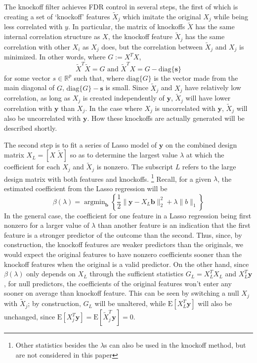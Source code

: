 \documentclass[11pt]{article}
\newcommand{\R}{\mathbb{R}}
\newcommand{\E}{\mathrm{E}}
\newcommand{\diag}[1]{\mathrm{diag}\{#1\}}
\theoremstyle{definition}
\DeclareMathOperator*{\argmin}{arg\min}
\begin{document}
    The knockoff filter achieves FDR control in several steps, the first of which is creating a set of `knockoff' features $\tilde X_j$ which imitate the original $X_j$ while being less correlated with $y$. In particular, the matrix of knockoffs $\tilde X$ has the same internal correlation structure as $X$, the knockoff feature $\tilde X_j$ has the same correlation with other $X_i$ as $X_j$ does, but the correlation between $\tilde X_j$ and $X_j$ is minimized. In other words, where $ G := X^TX$, 
    \[ \tilde X^T\tilde X=G \textrm{ and } \tilde X^T X = G - \diag{\mathbf s}\]
    for some vector $s\in \R^p$ such that, where $\diag{G}$ is the vector made from the main diagonal of $G$, $\diag{G} - \mathbf s$ is small. Since $\tilde X_j$ and $X_j$ have relatively low correlation, as long as $X_j$ is created independently of $\mathbf y$, $\tilde X_j$ will have lower correlation with $\mathbf y$ than $X_j$. In the case where $X_j$ is uncorrelated with $\mathbf y$, $\tilde X_j$ will also be uncorrelated with $\mathbf y$. How these knockoffs are actually generated will be described shortly.\par
    The second step is to fit a series of Lasso model of $\mathbf y$ on the combined design matrix $X_L=[X \; \tilde X]$ so as to determine the largest value $\lambda$ at which the coefficient for each $X_j$ and $\tilde X_j$ is nonzero. The subscript $L$ refers to the large design matrix with both features and knockoffs. \footnote{Other statistics besides the $\lambda$s can also be used in the knockoff method, but are not considered in this paper} Recall, for a given $\lambda$, the estimated coefficient from the Lasso regression will be 
    \[ \beta(\lambda) = \argmin_\mathbf b \left\{\frac{1}{2}\|\mathbf y - X_L\mathbf b\|^2_2 + \lambda\|b\|_1 \right\}\]
    In the general case, the coefficient for one feature in a Lasso regression being first nonzero for a larger value of $\lambda$ than another feature is an indication that the first feature is a stronger predictor of the outcome than the second. Thus, since, by construction, the knockoff features are weaker predictors than the originals, we would expect the original features to have nonzero coefficients sooner than the knockoff features when the original is a valid predictor. On the other hand, since $\beta(\lambda)$ only depends on $X_L$ through the sufficient statistics $G_L=X_L^TX_L$ and $X_L^T\mathbf y$, for null predictors, the coefficients of the original features won't enter any sooner on average than knockoff feature. This can be seen by switching a null $X_j$ with $\tilde X_j$; by construction, $G_L$ will be unaltered, while $\E\left[X_L^T\mathbf y\right]$ will also be unchanged, since $\E[X_j^T\mathbf y]=\E[\tilde X_j^T\mathbf y]=0$. \par
\end{document}
